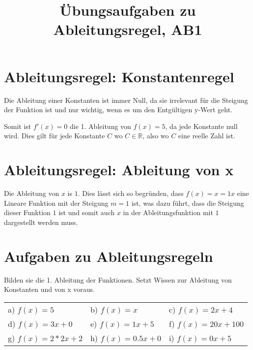 \documentclass[10pt,a4paper]{article}
\begin{document}
	
\title{Übungsaufgaben zu Ableitungsregel, AB1}

\makeatletter
\def\@maketitle{%
  \newpage
  \null
  \vskip 2em%
  \begin{center}%
  \let \footnote \thanks
    {\Huge\bfseries\@title \par}%
    \vskip 1.5em%
    {\large
      \lineskip .5em%
      \begin{tabular}[t]{c}%
        \@author
      \end{tabular}\par}%
    \vskip 1em%
    {\large \@date}%
  \end{center}%
  \par
  \vskip 1.5em}
\makeatother

\author{}
\date{}

\maketitle

\section*{Ableitungsregel: Konstantenregel}
Die Ableitung einer Konstanten ist immer Null, da sie irrelevant für die Steigung
der Funktion ist und nur wichtig, wenn es um den Entgültigen y-Wert geht.

Somit ist $f'(x) = 0$ die 1. Ableitung von $f(x) = 5$, da jede Konstante null wird.
Dies gilt für jede Konstante $C$ wo $C  \in \mathbb{R}$, also wo $C$ eine reelle Zahl ist.

\section*{Ableitungsregel: Ableitung von x}
Die Ableitung von $x$ is $1$. Dies lässt sich so begründen, dass $f(x) = x = 1x$
eine Lineare Funktion mit der Steigung $m = 1$ ist, was dazu führt, dass die Steigung dieser
Funktion $1$ ist und somit auch $x$ in der Ableitungsfunktion mit $1$ dargestellt werden muss.

\section*{Aufgaben zu Ableitungsregeln}
Bilden sie die 1. Ableitung der Funktionen. \newline
Setzt Wissen zur Ableitung von Konstanten und von x voraus. \newline

\begin{tabular}{l l l}

	a) $f(x) = 5$        & b) $f(x) = x$        & c) $f(x) = 2x + 4$ \\
	d) $f(x) = 3x + 0$   & e) $f(x) = 1x + 5$   & f) $f(x) = 20x + 100$ \\
	g) $f(x) = 2*2x + 2$ & h) $f(x) = 0.5x + 0$ & i) $f(x) = 0x + 5$

\end{tabular}
\end{document}
